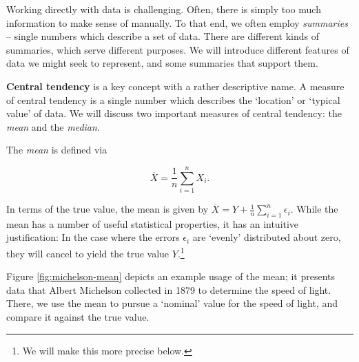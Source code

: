 \documentclass[../primer.tex]{subfiles}
\begin{document}
Working directly with data is challenging. Often, there is simply too much
information to make sense of manually. To that end, we often employ
\emph{summaries} -- single numbers which describe a set of data. There are
different kinds of summaries, which serve different purposes. We will introduce
different features of data we might seek to represent, and some summaries that
support them.


\textbf{Central tendency} is a key concept with a rather descriptive name. A
measure of central tendency is a single number which describes the `location' or
`typical value' of data. We will discuss two important measures of central
tendency: the \emph{mean} and the \emph{median}.

The \emph{mean} is defined via

\begin{equation} \label{eq:def-sample-mean}
  \overline{X} = \frac{1}{n}\sum_{i=1}^n X_i.
\end{equation}

\noindent In terms of the true value, the mean is given by $\overline{X} = Y +
\frac{1}{n}\sum_{i=1}^n \epsilon_i$. While the mean has a number of useful
statistical properties, it has an intuitive justification: In the case where the
errors $\epsilon_i$ are `evenly' distributed about zero, they will cancel to
yield the true value $Y$.\footnote{We will make this more precise below.}

Figure \ref{fig:michelson-mean} depicts an example usage of the mean; it
presents data that Albert Michelson collected in 1879 to determine the speed of
light.\cite{dorsey1944velocity} There, we use the mean to pursue a `nominal'
value for the speed of light, and compare it against the true value.
\end{document}
